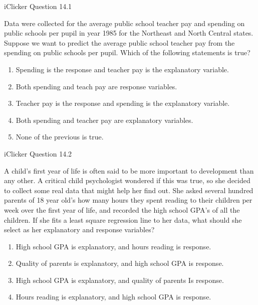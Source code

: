 \documentclass[14pt]{beamer}\usepackage[]{graphicx}\usepackage[]{color}
\begin{document}
\begin{frame}[fragile]{iClicker Question 14.1}

{\small{Data were collected for the average public school teacher pay and  spending on public schools per pupil in year 1985 for the Northeast  and North Central states. Suppose we want to predict the average  public school teacher pay from the spending on public schools per  pupil. Which of the following statements is true?


\begin{enumerate}[A]
\item Spending is the response and teacher pay is the  explanatory variable.
\item Both spending and teach pay are response variables.
\item Teacher pay is the response and spending is the  explanatory variable.
\item Both spending and teacher pay are explanatory variables.
\item None of the previous is true.
\end{enumerate}
}}
\end{frame}

\begin{frame}[fragile]{iClicker Question 14.2}

{\footnotesize{
A child's first year of life is often said to be more important to development than any other. A critical child psychologist wondered if this was true, so she decided to collect some real data that might help her find out. She asked several hundred parents of 18 year old's how many hours they spent reading to their children per week over the first year of life, and recorded the high school GPA's of all the children. If she fits a least square regression line to her data, what should she select as her explanatory and response variables?

\begin{enumerate}[A]
\item High school GPA is explanatory, and hours reading is response.
\item Quality of parents is explanatory, and high school GPA is response.
\item High school GPA is explanatory, and quality of parents Is response.
\item Hours reading is explanatory, and high school GPA is response.
\end{enumerate}
}}
\end{frame}
\end{document}
